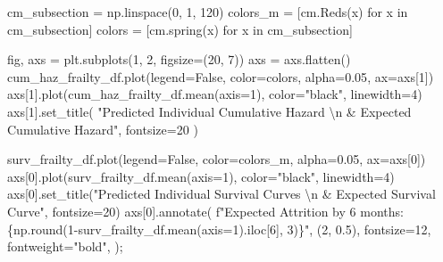 \documentclass[
  letterpaper,
  DIV=11,
  numbers=noendperiod]{scrartcl}
\newenvironment{Shaded}{\begin{snugshade}}{\end{snugshade}}
\newcommand{\BuiltInTok}[1]{\textcolor[rgb]{0.00,0.23,0.31}{#1}}
\newcommand{\CharTok}[1]{\textcolor[rgb]{0.13,0.47,0.30}{#1}}
\newcommand{\ControlFlowTok}[1]{\textcolor[rgb]{0.00,0.23,0.31}{#1}}
\newcommand{\DecValTok}[1]{\textcolor[rgb]{0.68,0.00,0.00}{#1}}
\newcommand{\FloatTok}[1]{\textcolor[rgb]{0.68,0.00,0.00}{#1}}
\newcommand{\KeywordTok}[1]{\textcolor[rgb]{0.00,0.23,0.31}{#1}}
\newcommand{\NormalTok}[1]{\textcolor[rgb]{0.00,0.23,0.31}{#1}}
\newcommand{\OperatorTok}[1]{\textcolor[rgb]{0.37,0.37,0.37}{#1}}
\newcommand{\SpecialCharTok}[1]{\textcolor[rgb]{0.37,0.37,0.37}{#1}}
\newcommand{\SpecialStringTok}[1]{\textcolor[rgb]{0.13,0.47,0.30}{#1}}
\newcommand{\StringTok}[1]{\textcolor[rgb]{0.13,0.47,0.30}{#1}}
\newcommand{\VariableTok}[1]{\textcolor[rgb]{0.07,0.07,0.07}{#1}}
\begin{document}
\begin{Shaded}
\begin{Highlighting}[]
\NormalTok{cm\_subsection }\OperatorTok{=}\NormalTok{ np.linspace(}\DecValTok{0}\NormalTok{, }\DecValTok{1}\NormalTok{, }\DecValTok{120}\NormalTok{)}
\NormalTok{colors\_m }\OperatorTok{=}\NormalTok{ [cm.Reds(x) }\ControlFlowTok{for}\NormalTok{ x }\KeywordTok{in}\NormalTok{ cm\_subsection]}
\NormalTok{colors }\OperatorTok{=}\NormalTok{ [cm.spring(x) }\ControlFlowTok{for}\NormalTok{ x }\KeywordTok{in}\NormalTok{ cm\_subsection]}


\NormalTok{fig, axs }\OperatorTok{=}\NormalTok{ plt.subplots(}\DecValTok{1}\NormalTok{, }\DecValTok{2}\NormalTok{, figsize}\OperatorTok{=}\NormalTok{(}\DecValTok{20}\NormalTok{, }\DecValTok{7}\NormalTok{))}
\NormalTok{axs }\OperatorTok{=}\NormalTok{ axs.flatten()}
\NormalTok{cum\_haz\_frailty\_df.plot(legend}\OperatorTok{=}\VariableTok{False}\NormalTok{, color}\OperatorTok{=}\NormalTok{colors, alpha}\OperatorTok{=}\FloatTok{0.05}\NormalTok{, ax}\OperatorTok{=}\NormalTok{axs[}\DecValTok{1}\NormalTok{])}
\NormalTok{axs[}\DecValTok{1}\NormalTok{].plot(cum\_haz\_frailty\_df.mean(axis}\OperatorTok{=}\DecValTok{1}\NormalTok{), color}\OperatorTok{=}\StringTok{"black"}\NormalTok{, linewidth}\OperatorTok{=}\DecValTok{4}\NormalTok{)}
\NormalTok{axs[}\DecValTok{1}\NormalTok{].set\_title(}
    \StringTok{"Predicted Individual Cumulative Hazard }\CharTok{\textbackslash{}n}\StringTok{ \& Expected Cumulative Hazard"}\NormalTok{, fontsize}\OperatorTok{=}\DecValTok{20}
\NormalTok{)}

\NormalTok{surv\_frailty\_df.plot(legend}\OperatorTok{=}\VariableTok{False}\NormalTok{, color}\OperatorTok{=}\NormalTok{colors\_m, alpha}\OperatorTok{=}\FloatTok{0.05}\NormalTok{, ax}\OperatorTok{=}\NormalTok{axs[}\DecValTok{0}\NormalTok{])}
\NormalTok{axs[}\DecValTok{0}\NormalTok{].plot(surv\_frailty\_df.mean(axis}\OperatorTok{=}\DecValTok{1}\NormalTok{), color}\OperatorTok{=}\StringTok{"black"}\NormalTok{, linewidth}\OperatorTok{=}\DecValTok{4}\NormalTok{)}
\NormalTok{axs[}\DecValTok{0}\NormalTok{].set\_title(}\StringTok{"Predicted Individual Survival Curves }\CharTok{\textbackslash{}n}\StringTok{  \& Expected Survival Curve"}\NormalTok{, fontsize}\OperatorTok{=}\DecValTok{20}\NormalTok{)}
\NormalTok{axs[}\DecValTok{0}\NormalTok{].annotate(}
    \SpecialStringTok{f"Expected Attrition by 6 months: }\SpecialCharTok{\{}\NormalTok{np}\SpecialCharTok{.}\BuiltInTok{round}\NormalTok{(}\DecValTok{1}\OperatorTok{{-}}\NormalTok{surv\_frailty\_df.mean(axis}\OperatorTok{=}\DecValTok{1}\NormalTok{).iloc[}\DecValTok{6}\NormalTok{], }\DecValTok{3}\NormalTok{)}\SpecialCharTok{\}}\SpecialStringTok{"}\NormalTok{,}
\NormalTok{    (}\DecValTok{2}\NormalTok{, }\FloatTok{0.5}\NormalTok{),}
\NormalTok{    fontsize}\OperatorTok{=}\DecValTok{12}\NormalTok{,}
\NormalTok{    fontweight}\OperatorTok{=}\StringTok{"bold"}\NormalTok{,}
\NormalTok{)}\OperatorTok{;}
\end{Highlighting}
\end{Shaded}
\end{document}
